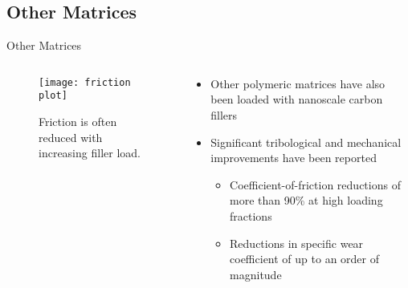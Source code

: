 \documentclass[12pt,letterpaper]{beamer}
\begin{document}
\subsection{Other Matrices}

\begin{frame}{Other Matrices}


  \begin{columns}[T]
      \begin{column}{.3\textwidth}
     \begin{block}{}
        \begin{figure}
                \texttt{[image: friction plot]}
                \caption{Friction is often reduced with increasing filler load.}
        \end{figure}
    \end{block}
    \end{column}  
      \begin{column}{.5\textwidth}
    \begin{block}{}
\begin{itemize}
\item Other polymeric matrices have also been loaded with nanoscale carbon fillers \cite{song2012preparation, li2012preparation}
\item Significant tribological and mechanical improvements have been reported
\begin{itemize}
\item Coefficient-of-friction reductions of more than 90\% at high loading fractions 
\item Reductions in specific wear coefficient of up to an order of magnitude \cite{balazsi2010tribology, pan2012wear,ren2013influence}
\end{itemize} 
\end{itemize}
        \end{block}
    \end{column}
  \end{columns}
\end{frame}
\end{document}
